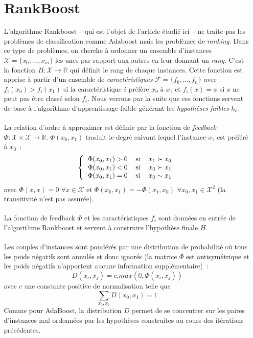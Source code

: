 \documentclass[pdftex,a4paper,11pt]{article}
\begin{document}
\section{RankBoost}

L'algorithme Rankboost -- qui est l'objet de l'article étudié ici -- ne traite pas les problèmes de classification comme Adaboost mais les problèmes de \emph{ranking}.
Dans ce type de problèmes, on cherche à ordonner un ensemble d’instances $\mathcal{X} = \{x_0, \dots, x_m\}$ les unes par rapport aux autres en leur donnant un \emph{rang}. C'est la fonction $H : \mathcal{X} \to \mathbb{R}$ qui définit le rang de chaque instances.
Cette fonction est apprise à partir d'un ensemble de \emph{caractéristiques} $\mathcal{F} = \{f_0, \dots, f_n \}$ avec $f_i(x_0) > f_i(x_1)$ si \og{}la caractéristique $i$ préfère $x_0$ à $x_1$\fg{} et $f_i(x) = \phi$ si $x$ ne peut pas être classé selon $f_i$.
Nous verrons par la suite que ces fonctions servent de base à l'algorithme d'apprentissage faible générant les \emph{hypothèses faibles} $h_t$.

\paragraph{}
La relation d'ordre à approximer est définie par la fonction de \emph{feedback} $\Phi : \mathcal{X} \times \mathcal{X} \to \mathbb{R}$.
$\Phi(x_0, x_1)$ traduit le degré suivant lequel l'instance $x_1$ est préféré à $x_0$~:
\[
    \left\{
    \begin{tabular}{lcl}
          $\Phi(x_0, x_1) > 0$  & si &  $x_1 \succ x_0$ \\
          $\Phi(x_0, x_1) < 0$  & si &  $x_0 \succ x_1$ \\
          $\Phi(x_0, x_1) = 0$  & si &  $x_0 \sim  x_1$
    \end{tabular}
    \right.
\]
avec $\Phi(x, x) = 0$ $\forall x \in \mathcal{X}$ et $\Phi(x_0, x_1) = -\Phi(x_1, x_0)$ $\forall x_0,x_1 \in \mathcal{X}^2$ (la transitivité n'est pas assurée).

\paragraph{}
La fonction de feedback $\Phi$ et les caractéristiques $f_i$ sont données en entrée de l'algorithme Rankboost et servent à construire l'hypothèse finale $H$.

\paragraph{}
Les couples d'instances sont pondérés par une distribution de probabilité où tous les poids négatifs sont annulés et donc ignorés (la matrice $\Phi$ est antisymétrique et les poids négatifs n'apportent aucune information supplémentaire)~:
\[
    D(x_i, x_j) = c . max(0, \Phi(x_i, x_j))
\]
avec $c$ une constante positive de normalisation telle que
\[
    \sum_{x_0,x_1} D(x_0, x_1) = 1
\]
Comme pour AdaBoost, la distribution $D$ permet de se concentrer sur les paires d'instances mal ordonnées par les hypothèses construites au cours des itérations précédentes.
\end{document}
